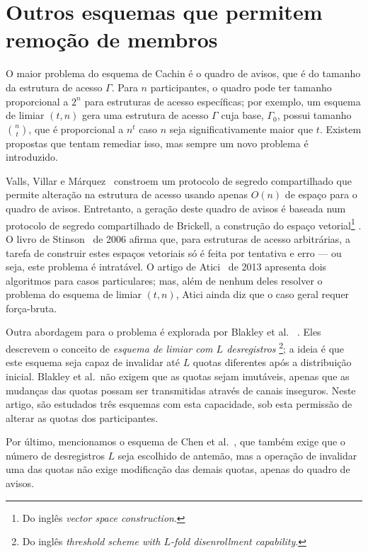 \documentclass[10pt,twocolumn]{article}
\theoremstyle{definition}
\begin{document}
\section{Outros esquemas que permitem remoção de membros}

O maior problema do esquema de Cachin é o quadro de avisos,
que é do tamanho da estrutura de acesso $\Gamma$.
Para $n$ participantes,
o quadro pode ter tamanho proporcional a $2^n$
para estruturas de acesso específicas;
por exemplo,
um esquema de limiar $(t, n)$
gera uma estrutura de acesso $\Gamma$
cuja base, $\Gamma_0$,
possui tamanho $\binom n t$,
que é proporcional a $n^t$ caso $n$ seja significativamente maior que $t$.
Existem propostas que tentam remediar isso,
mas sempre um novo problema é introduzido.

Valls, Villar e Márquez~\cite{VallsVillarMarquez1999}
constroem um protocolo de segredo compartilhado
que permite alteração na estrutura de acesso
usando apenas $O(n)$ de espaço para o quadro de avisos.
Entretanto,
a geração deste quadro de avisos é baseada
num protocolo de segredo compartilhado de Brickell,
a construção do espaço vetorial\footnote{
    Do inglês \emph{vector space construction}.
}
\cite{Brickell1990}.
O livro de Stinson~\cite[p.~499]{Stinson2006} de 2006
afirma que, para estruturas de acesso arbitrárias,
a tarefa de construir estes espaços vetoriais
só é feita por tentativa e erro
--- ou seja, este problema é intratável.
O artigo de Atici~\cite{Atici2013} de 2013
apresenta dois algoritmos para casos particulares;
mas, além de nenhum deles resolver o problema do esquema de limiar $(t, n)$,
Atici ainda diz que o caso geral requer força-bruta.

Outra abordagem para o problema é explorada por Blakley et al.%
~\cite{BlakleyBlakleyChanMassey1993}.
Eles descrevem o conceito de \emph{esquema de limiar com $L$ desregistros}%
\footnote{
    Do inglês \emph{threshold scheme with $L$-fold disenrollment capability}.
};
a ideia é que este esquema
seja capaz de invalidar até $L$ quotas diferentes após a distribuição inicial.
Blakley et al.\ não exigem que as quotas sejam imutáveis,
apenas que as mudanças das quotas possam ser transmitidas através de canais inseguros.
Neste artigo,
são estudados três esquemas com esta capacidade,
sob esta permissão de alterar as quotas dos participantes.

Por último,
mencionamos o esquema de Chen et al.~\cite{ChenGollmanMitchellWild1997},
que também exige que o número de desregistros $L$ seja escolhido de antemão,
mas a operação de invalidar uma das quotas
não exige modificação das demais quotas,
apenas do quadro de avisos.



\end{document}
